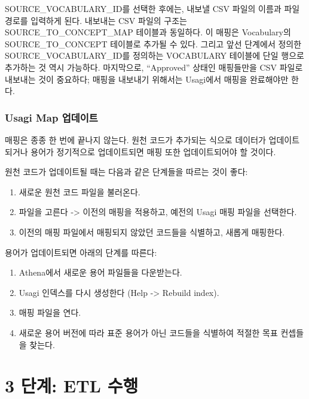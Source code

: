\documentclass[11pt]{book}
\providecommand{\tightlist}{%
  \setlength{\itemsep}{0pt}\setlength{\parskip}{0pt}}
\theoremstyle{definition}
\theoremstyle{definition}
\theoremstyle{definition}
\theoremstyle{remark}
\begin{document}
SOURCE\_VOCABULARY\_ID를 선택한 후에는, 내보낼 CSV 파일의 이름과 파일
경로를 입력하게 된다. 내보내는 CSV 파일의 구조는
SOURCE\_TO\_CONCEPT\_MAP 테이블과 동일하다. 이 매핑은 Vocabulary의
SOURCE\_TO\_CONCEPT 테이블로 추가될 수 있다. 그리고 앞선 단계에서 정의한
SOURCE\_VOCABULARY\_ID를 정의하는 VOCABULARY 테이블에 단일 행으로
추가하는 것 역시 가능하다. 마지막으로, ``Approved'' 상태인 매핑들만을
CSV 파일로 내보내는 것이 중요하다; 매핑을 내보내기 위해서는 Usagi에서
매핑을 완료해야만 한다.

\subsubsection*{Usagi Map 업데이트}\label{usagi-map-}

매핑은 종종 한 번에 끝나지 않는다. 원천 코드가 추가되는 식으로 데이터가
업데이트되거나 용어가 정기적으로 업데이트되면 매핑 또한 업데이트되어야
할 것이다.

원천 코드가 업데이트될 때는 다음과 같은 단계들을 따르는 것이 좋다:

\begin{enumerate}
\def\labelenumi{\arabic{enumi}.}
\tightlist
\item
  새로운 원천 코드 파일을 불러온다.
\item
  파일을 고른다 -\textgreater{} 이전의 매핑을 적용하고, 예전의 Usagi
  매핑 파일을 선택한다.
\item
  이전의 매핑 파일에서 매핑되지 않았던 코드들을 식별하고, 새롭게
  매핑한다.
\end{enumerate}

용어가 업데이트되면 아래의 단계를 따른다:

\begin{enumerate}
\def\labelenumi{\arabic{enumi}.}
\tightlist
\item
  Athena에서 새로운 용어 파일들을 다운받는다.
\item
  Usagi 인덱스를 다시 생성한다 (Help -\textgreater{} Rebuild index).
\item
  매핑 파일을 연다.
\item
  새로운 용어 버전에 따라 표준 용어가 아닌 코드들을 식별하여 적절한 목표
  컨셉들을 찾는다.
\end{enumerate}

\section{3 단계: ETL 수행}\label{-etl-}
\end{document}
